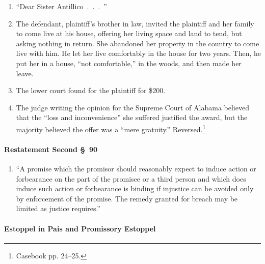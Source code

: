 \begin{enumerate}
    \item ``Dear Sister Antillico~.~.~.~''
    \item The defendant, plaintiff's brother in law, invited the plaintiff and 
    her family to come live at his house, offering her living space and land 
    to tend, but asking nothing in return. She abandoned her property in the 
    country to come live with him. He let her live comfortably in the house 
    for two years. Then, he put her in a house, ``not comfortable,'' in the 
    woods, and then made her leave.
    \item The lower court found for the plaintiff for \$200.
    \item The judge writing the opinion for the Supreme Court of Alabama 
    believed that the ``loss and inconvenience'' she suffered justified the 
    award, but the majority believed the offer was a ``mere gratuity.'' 
    Reversed.\footnote{Casebook pp. 24--25.}
\end{enumerate}

\paragraph{Restatement Second \S\ 90}

\begin{enumerate}
    \item ``A promise which the promisor should reasonably expect to induce 
    action or forbearance on the part of the promisee or a third person and 
    which does induce such action or forbearance is binding if injustice can 
    be avoided only by enforcement of the promise. The remedy granted for 
    breach may be limited as justice requires.''
\end{enumerate}

\paragraph{Estoppel in Pais and Promissory Estoppel}

